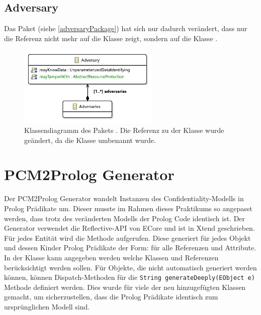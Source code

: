 \documentclass[twoside, ngerman]{sdqseminar}
\begin{document}
\subsection{Adversary}
Das Paket  (siehe \autoref{adversaryPackage}) hat sich nur dadurch verändert, dass nur die Referenz  nicht mehr auf die Klasse  zeigt, sondern auf die Klasse .
\begin{figure}[htbp]
	\centering
	\includegraphics[width=0.6\textwidth]{images/new/adversary.pdf}
	\caption{Klassendiagramm des Pakets . Die Referenz zu der Klasse  wurde geändert, da die Klasse umbenannt wurde.}\label{adversaryPackage}
\end{figure}

\section{PCM2Prolog Generator}
Der PCM2Prolog Generator wandelt Instanzen des Confidentiality-Modells in Prolog Prädikate um. Dieser musste im Rahmen dieses Praktikums so angepasst werden, dass trotz des veränderten Modells der Prolog Code identisch ist. Der Generator verwendet die Reflective-API von ECore und ist in Xtend geschrieben. Für jedes Entität wird die Methode  aufgerufen. Diese generiert für jedes Objekt und dessen Kinder Prolog Prädikate der Form:  für alle Referenzen und Attribute. In der Klasse  kann angegeben werden welche Klassen und Referenzen berücksichtigt werden sollen. Für Objekte, die nicht automatisch generiert werden können, können Dispatch-Methoden für die  \texttt{String generateDeeply(EObject e)} Methode definiert werden. Dies wurde für viele der neu hinzugefügten Klassen gemacht, um sicherzustellen, dass die Prolog Prädikate identisch zum ursprünglichen Modell sind.
\end{document}
